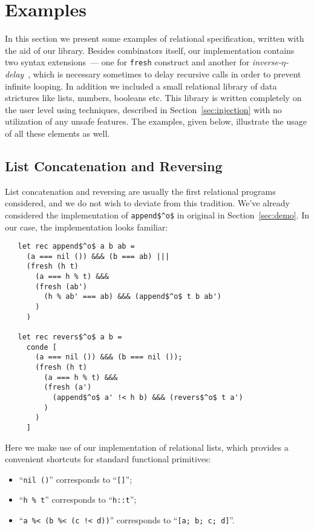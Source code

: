 \section{Examples}
\label{sec:examples}

In this section we present some examples of relational specification, written with the aid of our library. 
Besides \miniKanren combinators itself, our implementation contains two syntax extensions~--- one
for \lstinline{fresh} construct and another for \emph{inverse-$\eta$-delay}~\cite{MicroKanren}, which is 
necessary sometimes to delay recursive calls in order to prevent infinite looping. In addition we included a 
small relational library of data strictures like lists, numbers, booleans etc. This library is written 
completely on the user level using techniques, described in Section~\ref{sec:injection} with no utilization 
of any unsafe features. The examples, given below, illustrate the usage of all these elements as well.

\subsection{List Concatenation and Reversing}

List concatenation and reversing are usually the first relational programs considered, and we do not wish
to deviate from this tradition. We've already considered the implementation of \lstinline{append$^o$} in
original \miniKanren in Section~\ref{sec:demo}. In our case, the implementation looks familiar:

\begin{lstlisting}
   let rec append$^o$ a b ab =
     (a === nil ()) &&& (b === ab) |||
     (fresh (h t)
       (a === h % t) &&&
       (fresh (ab')
         (h % ab' === ab) &&& (append$^o$ t b ab') 
       )
     )

   let rec revers$^o$ a b =
     conde [
       (a === nil ()) &&& (b === nil ());
       (fresh (h t)
         (a === h % t) &&&
         (fresh (a')
           (append$^o$ a' !< h b) &&& (revers$^o$ t a')
         )
       )
     ]
\end{lstlisting}

Here we make use of our implementation of relational lists, which provides a convenient shortcuts for
standard functional primitives:

\begin{itemize}
  \item ``\lstinline{nil ()}'' corresponds to ``\lstinline{[]}'';
  \item ``\lstinline{h % t}'' corresponds to ``\lstinline{h::t}'';
  \item ``\lstinline{a %< (b %< (c !< d))}'' corresponds to ``\lstinline{[a; b; c; d]}''.
\end{itemize}

